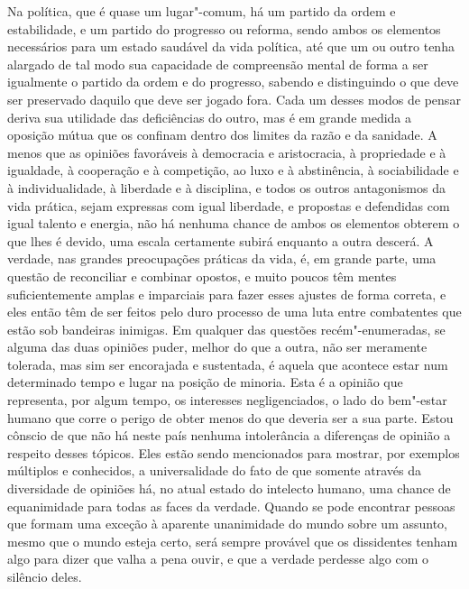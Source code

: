 Na política, que é quase um lugar"-comum, há um partido da ordem e
estabilidade, e um partido do progresso ou reforma, sendo ambos os
elementos necessários para um estado saudável da vida política, até que
um ou outro tenha alargado de tal modo sua capacidade de compreensão
mental de forma a ser igualmente o partido da ordem e do progresso,
sabendo e distinguindo o que deve ser preservado daquilo que deve ser
jogado fora. Cada um desses modos de pensar deriva sua utilidade das
deficiências do outro, mas é em grande medida a oposição mútua que os
confinam dentro dos limites da razão e da sanidade. A menos que as
opiniões favoráveis à democracia e aristocracia, à propriedade e à
igualdade, à cooperação e à competição, ao luxo e à abstinência, à
sociabilidade e à individualidade, à liberdade e à disciplina, e todos
os outros antagonismos da vida prática, sejam expressas com igual
liberdade, e propostas e defendidas com igual talento e energia, não há
nenhuma chance de ambos os elementos obterem o que lhes é devido, uma
escala certamente \mbox{subirá} enquanto a outra descerá. A verdade, nas
grandes preocupações práticas da vida, é, em grande parte, uma
questão de reconciliar e combinar opostos, e muito poucos têm mentes
suficientemente amplas e imparciais para fazer esses ajustes de forma
correta, e eles então têm de ser feitos pelo duro processo de uma luta
entre combatentes que estão sob bandeiras inimigas. Em qualquer das
questões recém"-enumeradas, se alguma das duas opiniões puder, 
melhor do que a outra, não ser meramente tolerada, mas
sim ser encorajada e sustentada, é aquela que acontece estar num
determinado tempo e lugar na posição de minoria. Esta é a opinião que
representa, por algum tempo, os interesses negligenciados, o lado do
bem"-estar humano que corre o perigo de obter menos do que deveria ser a
sua parte. Estou cônscio de que não há neste país nenhuma intolerância
a diferenças de opinião a respeito desses tópicos. Eles
estão sendo mencionados para mostrar, por exemplos múltiplos e
conhecidos, a universalidade do fato de que somente através da
diversidade de opiniões há, no atual estado do intelecto humano,
uma chance de equanimidade para todas as faces da verdade. Quando se
pode encontrar pessoas que formam uma exceção à aparente unanimidade do
mundo sobre um assunto, mesmo que o mundo esteja certo, será sempre
provável que os dissidentes tenham algo para dizer que valha a pena
ouvir, e que a verdade perdesse algo com o silêncio deles.

